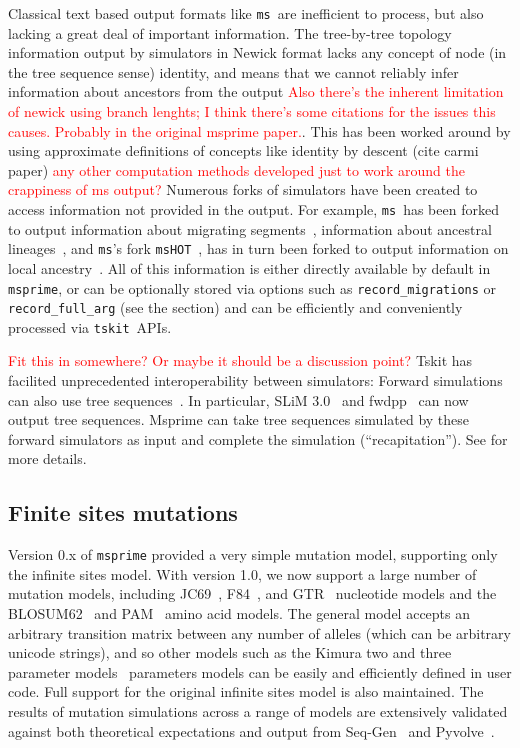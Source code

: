 \documentclass{article}
\newcommand{\msprime}[0]{\texttt{msprime}}
\newcommand{\tskit}[0]{\texttt{tskit}}
\newcommand{\ms}[0]{\texttt{ms}}
\newcommand{\jkcomment}[1]{\textcolor{red}{#1}}
\begin{document}
Classical text based output formats like \ms\ are inefficient to process,
but also lacking a great deal of important information.
The tree-by-tree topology information output by simulators in Newick
format lacks any concept of node (in the tree sequence sense) identity,
and means that we cannot reliably infer information about ancestors
from the output \jkcomment{Also there's the inherent limitation of
newick using branch lenghts; I think there's some citations for
the issues this causes. Probably in the original msprime paper.}.
This has been worked around by using approximate definitions of
concepts like identity by descent (cite carmi paper) \jkcomment{
any other computation methods developed just to work around the
crappiness of ms output?}
Numerous forks
of simulators have been created to access information not provided
in the output. For example, \ms\  has been forked to
output information about migrating segments~\citep{rosenzweig2016powerful},
information about ancestral lineages~\citep{chen2013asymptotic},
and \ms's fork \texttt{msHOT}~\citep{hellenthal2007mshot},
has in turn been forked to output information on local
ancestry~\citep{racimo2017archaic}.
All of this information
is either directly available by default in \msprime, or can be optionally
stored via options such as \texttt{record\_migrations} or
\texttt{record\_full\_arg} (see the  section) and
can be efficiently and conveniently processed via \tskit\ APIs.


\jkcomment{Fit this in somewhere? Or maybe it should be a discussion point?}
Tskit has facilited unprecedented interoperability between simulators:
Forward simulations can also use tree
sequences~\citep{kelleher2018efficient,haller2018tree}. In particular, SLiM
3.0~\citep{haller2019slim} and fwdpp~\citep{thornton2014cpp} can now output
tree sequences. Msprime can take tree sequences simulated by these forward
simulators as input and complete the simulation (``recapitation'').
See \cite{haller2018tree} for more details.


\subsection*{Finite sites mutations}
\label{sec-mutations}
Version 0.x of \texttt{msprime} provided a very simple mutation model,
supporting only the infinite sites model.
With version 1.0, we now support a large number of mutation models,
including
JC69~\citep{jukes1969evolution},
F84~\citep{felsenstein1996hidden},
and GTR~\citep{tavare1986some} nucleotide models
and the BLOSUM62~\citep{henikoff1992amino}
and PAM~\citep{dayhoff1978} amino acid models.
The general model accepts an arbitrary transition matrix between
any number of alleles (which can be arbitrary unicode strings),
and so other models such as the Kimura two and three
parameter models~\citep{kimura1980simple,kimura1981estimation}
parameters models can be easily
and efficiently defined in user code.
Full support for the original infinite sites model is also maintained.
The results of mutation simulations across a range of models are
extensively validated
against both theoretical expectations and output from
Seq-Gen~\citep{rambaut1997seq} and
Pyvolve~\citep{spielman2015pyvolve}.
\end{document}
